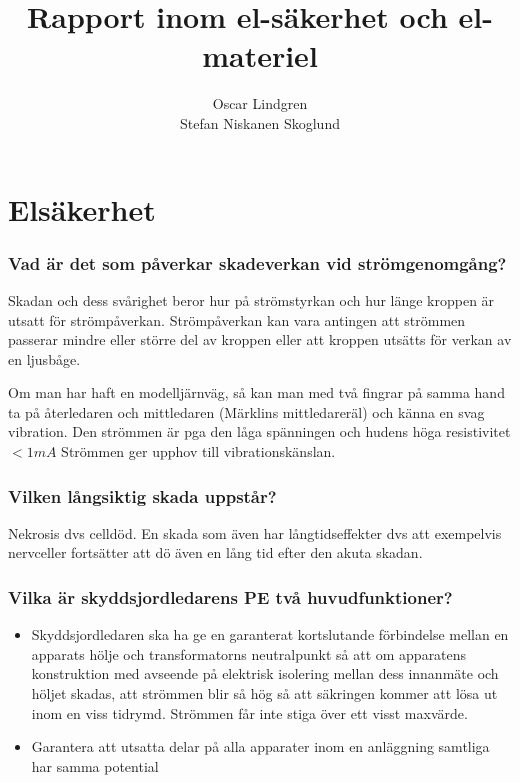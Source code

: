 \documentclass[a4paper,swedish]{article}
\title{Rapport inom el-säkerhet och el-materiel}
\author{Oscar Lindgren\\Stefan Niskanen Skoglund}
\begin{document}
\part{Elsäkerhet}
\setcounter{section}{1}
\section{Vad är det som påverkar skadeverkan vid strömgenomgång?} \label{sec:strömgenomgång}

Skadan och dess svårighet beror hur på strömstyrkan och hur länge kroppen är utsatt för strömpåverkan.
Strömpåverkan kan vara antingen att strömmen passerar mindre eller större del av kroppen eller att kroppen
utsätts för verkan av en ljusbåge.

Om man har haft en modelljärnväg, så kan man med två fingrar på samma hand ta på återledaren och mittledaren (Märklins mittledareräl) och känna en svag
vibration. Den strömmen är pga den låga spänningen och hudens höga resistivitet $< 1 mA$
Strömmen ger upphov till vibrationskänslan.

\setcounter{section}{3}
\section{Vilken långsiktig skada uppstår?}\label{sec:permanent_skada}

Nekrosis dvs celldöd. En skada som även har långtidseffekter dvs att exempelvis nervceller
fortsätter att dö även en lång tid efter den akuta skadan.

\setcounter{section}{5}
\section{Vilka är skyddsjordledarens PE två huvudfunktioner?}\label{sec:skyddsjordsledarens_funktioner}

\begin{itemize}
\item Skyddsjordledaren ska ha ge en garanterat kortslutande förbindelse mellan en apparats hölje
och transformatorns neutralpunkt så att om apparatens konstruktion
med avseende på elektrisk isolering mellan dess innanmäte och höljet skadas, att strömmen
blir så hög så att säkringen kommer att lösa ut inom en viss tidrymd. Strömmen får inte stiga
över ett visst maxvärde.
\item Garantera att utsatta delar på alla apparater inom en anläggning samtliga har samma potential
\end{itemize}
\end{document}
